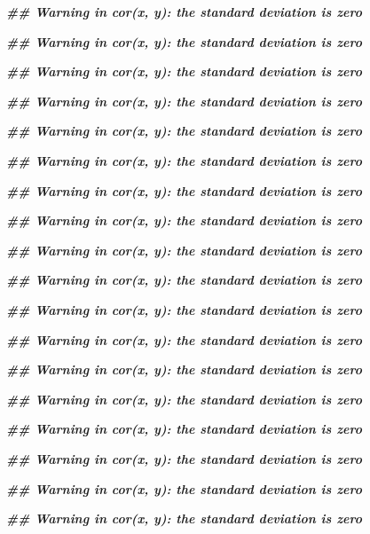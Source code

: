 \documentclass[
]{book}
\newenvironment{Shaded}{\begin{snugshade}}{\end{snugshade}}
\newcommand{\DocumentationTok}[1]{\textcolor[rgb]{0.56,0.35,0.01}{\textbf{\textit{#1}}}}
\begin{document}
\begin{Shaded}
\begin{Highlighting}[]
\DocumentationTok{\#\# Warning in cor(x, y): the standard deviation is zero}

\DocumentationTok{\#\# Warning in cor(x, y): the standard deviation is zero}

\DocumentationTok{\#\# Warning in cor(x, y): the standard deviation is zero}

\DocumentationTok{\#\# Warning in cor(x, y): the standard deviation is zero}

\DocumentationTok{\#\# Warning in cor(x, y): the standard deviation is zero}

\DocumentationTok{\#\# Warning in cor(x, y): the standard deviation is zero}

\DocumentationTok{\#\# Warning in cor(x, y): the standard deviation is zero}

\DocumentationTok{\#\# Warning in cor(x, y): the standard deviation is zero}

\DocumentationTok{\#\# Warning in cor(x, y): the standard deviation is zero}

\DocumentationTok{\#\# Warning in cor(x, y): the standard deviation is zero}

\DocumentationTok{\#\# Warning in cor(x, y): the standard deviation is zero}

\DocumentationTok{\#\# Warning in cor(x, y): the standard deviation is zero}

\DocumentationTok{\#\# Warning in cor(x, y): the standard deviation is zero}

\DocumentationTok{\#\# Warning in cor(x, y): the standard deviation is zero}

\DocumentationTok{\#\# Warning in cor(x, y): the standard deviation is zero}

\DocumentationTok{\#\# Warning in cor(x, y): the standard deviation is zero}

\DocumentationTok{\#\# Warning in cor(x, y): the standard deviation is zero}

\DocumentationTok{\#\# Warning in cor(x, y): the standard deviation is zero}


\end{Highlighting}
\end{Shaded}
\end{document}

